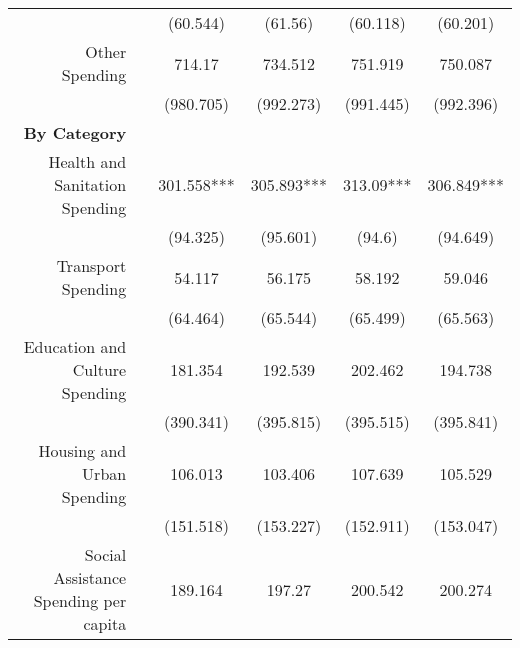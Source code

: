 \begin{table}[h!]
\begin{footnotesize}
\begin{center}
{\begin{threeparttable}[b]
\begin{tabular}{rrrrrr}
          &       & \multicolumn{1}{c}{(60.544)} & \multicolumn{1}{c}{(61.56)} & \multicolumn{1}{c}{(60.118)} & \multicolumn{1}{c}{(60.201)} \\
    \multicolumn{1}{p{17.645em}}{Other Spending} &       & \multicolumn{1}{c}{714.17} & \multicolumn{1}{c}{734.512} & \multicolumn{1}{c}{751.919} & \multicolumn{1}{c}{750.087} \\
          &       & \multicolumn{1}{c}{(980.705)} & \multicolumn{1}{c}{(992.273)} & \multicolumn{1}{c}{(991.445)} & \multicolumn{1}{c}{(992.396)} \\
    \multicolumn{1}{p{17.645em}}{\textbf{By Category}} &       &       &       &       &  \\
    \multicolumn{1}{p{17.645em}}{Health and Sanitation Spending} &       & \multicolumn{1}{c}{301.558***} & \multicolumn{1}{c}{305.893***} & \multicolumn{1}{c}{313.09***} & \multicolumn{1}{c}{306.849***} \\
          &       & \multicolumn{1}{c}{(94.325)} & \multicolumn{1}{c}{(95.601)} & \multicolumn{1}{c}{(94.6)} & \multicolumn{1}{c}{(94.649)} \\
    \multicolumn{1}{p{17.645em}}{Transport Spending} &       & \multicolumn{1}{c}{54.117} & \multicolumn{1}{c}{56.175} & \multicolumn{1}{c}{58.192} & \multicolumn{1}{c}{59.046} \\
          &       & \multicolumn{1}{c}{(64.464)} & \multicolumn{1}{c}{(65.544)} & \multicolumn{1}{c}{(65.499)} & \multicolumn{1}{c}{(65.563)} \\
    \multicolumn{1}{p{17.645em}}{Education and Culture Spending} &       & \multicolumn{1}{c}{181.354} & \multicolumn{1}{c}{192.539} & \multicolumn{1}{c}{202.462} & \multicolumn{1}{c}{194.738} \\
          &       & \multicolumn{1}{c}{(390.341)} & \multicolumn{1}{c}{(395.815)} & \multicolumn{1}{c}{(395.515)} & \multicolumn{1}{c}{(395.841)} \\
    \multicolumn{1}{p{17.645em}}{Housing and Urban Spending} &       & \multicolumn{1}{c}{106.013} & \multicolumn{1}{c}{103.406} & \multicolumn{1}{c}{107.639} & \multicolumn{1}{c}{105.529} \\
          &       & \multicolumn{1}{c}{(151.518)} & \multicolumn{1}{c}{(153.227)} & \multicolumn{1}{c}{(152.911)} & \multicolumn{1}{c}{(153.047)} \\
    \multicolumn{1}{p{17.645em}}{Social Assistance Spending per capita} &       & \multicolumn{1}{c}{189.164} & \multicolumn{1}{c}{197.27} & \multicolumn{1}{c}{200.542} & \multicolumn{1}{c}{200.274} \\

\end{tabular}
\end{threeparttable}}
\end{center}
\end{footnotesize}
\end{table}
